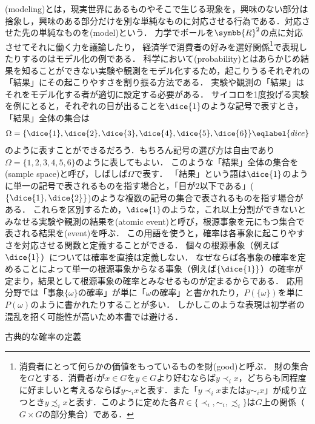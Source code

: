 \documentclass[main.tex]{subfiles}
\begin{document}

(modeling)とは，現実世界にあるものやそこで生じる現象を，興味のない部分は捨象し，興味のある部分だけを別な単純なものに対応させる行為である．対応させた先の単純なものを(model)という．
力学でボールを\(\symbb{R}^2\)の点に対応させてそれに働く力を議論したり，
経済学で消費者の好みを選好関係\footnote{%
消費者にとって何らかの価値をもっているものを財(good)と呼ぶ．
財の集合を\(G\)とする．消費者\(i\)が\(x \in G\)を\(y \in G\)より好むならば\(y \prec_i x\)，どちらも同程度に好ましいと考えるならば\(y \sim_i x\)と表す．また「\(y \prec_i x\)または\(y \sim_i x\)」が成り立つとき\(y \precsim_i x\)と表す．このように定めた各\(R \in \{\prec_i, \sim_i, \precsim_i\}\)は\(G\)上の関係（\(G \times G\)の部分集合）である．
}で表現したりするのはモデル化の例である．
科学において(probability)とはあらかじめ結果を知ることができない実験や観測をモデル化するため，起こりうるそれぞれの「結果」にその起こりやすさを割り振る方法である．
実験や観測の「結果」はそれをモデル化する者が適切に設定する必要がある．
サイコロを1度投げる実験を例にとると，それぞれの目が出ることを\(\dice{1}\)のような記号で表すとき，「結果」全体の集合は
\begin{align}
    \Omega = \{\dice{1}, \dice{2}, \dice{3}, \dice{4}, \dice{5}, \dice{6}\} \eqlabel{dice}
\end{align}
のように表すことができるだろう．もちろん記号の選び方は自由であり\(\Omega = \{1, 2, 3, 4, 5, 6\}\)のように表してもよい．
このような「結果」全体の集合を(sample space)と呼び，しばしば\(\Omega\)で表す．
「結果」という語は\(\dice{1}\)のように単一の記号で表されるものを指す場合と，「目が\(2\)以下である」(\(\{\dice{1}, \dice{2}\}\))のような複数の記号の集合で表されるものを指す場合がある．
これらを区別するため，\(\dice{1}\)のような，これ以上分割ができないとみなせる実験や観測の結果を(atomic event)と呼び，根源事象を元にもつ集合で表される結果を(event)を呼ぶ．
この用語を使うと，確率は各事象に起こりやすさを対応させる関数と定義することができる．
個々の根源事象（例えば\(\dice{1}\)）については確率を直接は定義しない．
なぜならば各事象の確率を定めることによって単一の根源事象からなる事象（例えば\(\{\dice{1}\}\)）の確率が定まり，結果として根源事象の確率とみなせるものが定まるからである．
応用分野では「事象\(\{\omega\}\)の確率」が単に「\(\omega\)の確率」と書かれたり，\(P(\{\omega\})\)を単に\(P(\omega)\)のように書かれたりすることが多い．
しかしこのような表現は初学者の混乱を招く可能性が高いため本書では避ける．

古典的な確率の定義\cite{laplace}
\end{document}

